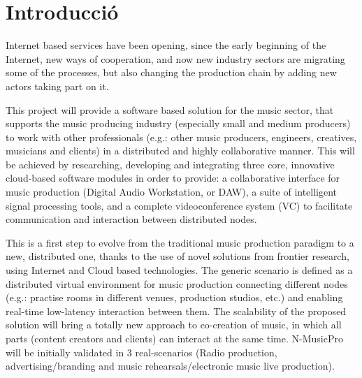 \cleardoublepage
{}
\chapter*{Introducció}

Internet based services have been opening, since the early beginning of the Internet, new ways of cooperation, and now new industry sectors are migrating some of the processes, but also changing the production chain by adding new actors taking part on it. 

This project will provide a software based solution for the music sector, that supports the music producing industry (especially small and medium producers) to work with other professionals (e.g.: other music producers, engineers, creatives, musicians and clients) in a distributed and highly collaborative manner. This will be achieved by researching, developing and integrating three core, innovative cloud-based software modules in order to provide: a collaborative interface for music production (Digital Audio Workstation, or DAW), a suite of intelligent signal processing tools, and a complete videoconference system (VC) to facilitate communication and interaction between distributed nodes.

This is a first step to evolve from the traditional music production paradigm to a new, distributed one, thanks to the use of novel solutions from frontier research, using Internet and Cloud based technologies. The generic scenario is defined as a distributed virtual environment for music production connecting different nodes (e.g.: practise rooms in different venues, production studios, etc.) and enabling real-time low-latency interaction between them. The scalability of the proposed solution will bring a totally new approach to co-creation of music, in which all parts (content creators and clients) can interact at the same time. N-MusicPro will be initially validated in 3 real-scenarios (Radio production, advertising/branding and music rehearsals/electronic music live production).

